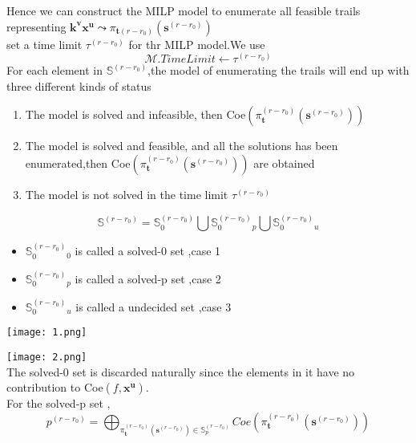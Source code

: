 \documentclass[notheorems,aspectratio=169]{beamer}
\def\bd#1{\boldsymbol{#1}}
\begin{document}
\begin{frame}
    Hence we can construct the MILP model to enumerate all feasible trails representing
    $\bd{k}^{\bd{v}}\bd{x}^{\bd{u}}\leadsto \pi_{\bd{t}(r-r_0)}(\bd{s}^{(r-r_0)})$
    \\ set a time limit $\tau^{(r-r_0)}$ for thr MILP model.We use 
    $$
    \mathcal{M}.TimeLimit \leftarrow \tau^{(r-r_0)}
    $$ 
    For each element in $\mathbb{S}^{(r-r_0)}$,the model of enumerating the trails will end up with three different kinds of status
    \begin{enumerate}
        \item The model is solved and infeasible, then Coe$(\pi _{\bd{t}}^{(r-r_0)}(\bd{s}^{(r-r_0)}) )$
        \item The model is solved and feasible, and all the solutions has been enumerated,then 
        Coe$(\pi _{\bd{t}}^{(r-r_0)}(\bd{s}^{(r-r_0)}) )$ are obtained
        \item The model is not solved in the time limit $\tau^{(r-r_0)}$
    \end{enumerate}
    
        $$\mathbb{S}^{(r-r_0)}=\mathbb{S}_0^{(r-r_0)} \bigcup  \mathbb{S}_0^{(r-r_0)}_p \bigcup \mathbb{S}_0^{(r-r_0)}_u$$
        \begin{itemize}
            \item $\mathbb{S}_0^{(r-r_0)}_0$ is called a solved-0 set ,case 1
            \item $\mathbb{S}_0^{(r-r_0)}_p$ is called a solved-p set ,case 2
            \item $\mathbb{S}_0^{(r-r_0)}_u$ is called a undecided set ,case 3
        \end{itemize}
    
\end{frame}


\begin{frame}
            \texttt{[image: 1.png]}
\end{frame}

\begin{frame}
    \texttt{[image: 2.png]}
    \\The solved-0 set is discarded naturally since the elements in it have no contribution to
    Coe$(f,\bd{x}^{\bd{u}} )$. \\
    For the solved-p set , 
    $$
    p^{(r-r_0)}=\bigoplus_{\pi _{\bd{t}}^{(r-r_0)}(\bd{s}^{(r-r_0)}) \in \mathbb{S}_p^{(r-r_0)} }
    Coe(\pi _{\bd{t}}^{(r-r_0)}(\bd{s}^{(r-r_0)}) )
    $$
    
\end{frame}
\end{document}
